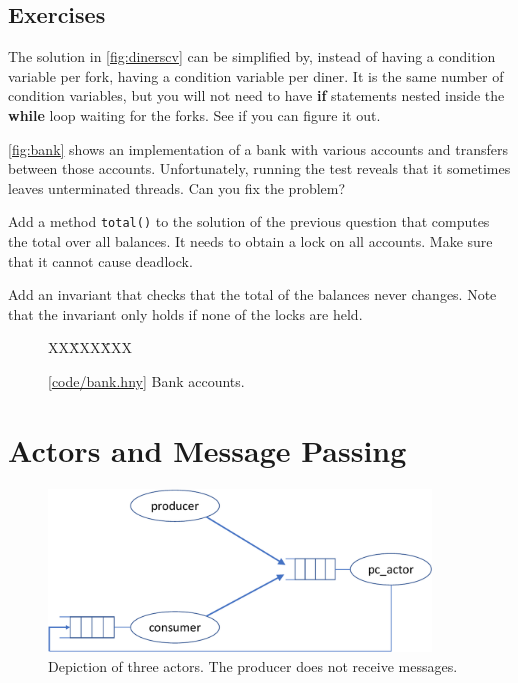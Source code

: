 \documentclass{report}
\newcommand{\harmonysource}[1]{
\begin{tabbing}
XX\=XXX\=XXX\kill
    
\end{tabbing}
}
\newcommand{\harmonylink}[1]{%
[\href{https://harmony.cs.cornell.edu/#1}{\underline{#1}}]%
}
\newenvironment{code}{
\tcolorbox
}{
\endtcolorbox
}
\begin{document}
\section*{Exercises}
\begin{problems}
\item The solution in \autoref{fig:dinerscv} can be simplified by, instead
of having a condition variable per fork, having a condition variable per
diner.  It is the same number of condition variables, but you will not
need to have \textbf{if} statements nested inside the \textbf{while} loop
waiting for the forks.  See if you can figure it out.
\item \label{ex:bank} \autoref{fig:bank} shows an implementation of a bank with various
accounts and transfers between those accounts.
Unfortunately, running the test reveals that it sometimes leaves unterminated
threads.  Can you fix the problem?
\item Add a method \texttt{total()} to the solution of the previous question
that computes the total over all balances.
It needs to obtain a lock on all accounts.  Make sure that
it cannot cause deadlock.
\item Add an invariant that checks that the total of the balances never
changes.  Note that the invariant only holds if none of the locks are
held.
\end{problems}

\begin{figure}
\begin{code}
\harmonysource{bank}
\end{code}
\caption{\harmonylink{code/bank.hny} Bank accounts.}
\label{fig:bank}
\end{figure}

\chapter{Actors and Message Passing}
\label{ch:actor}
%
%

%

\begin{figure}
\begin{center}
\includegraphics[width=4in]{figures/actor-crop.pdf}
\end{center}
\caption{Depiction of three actors.  The producer does not receive messages.}
\label{fig:actorpic}
\end{figure}
\end{document}
